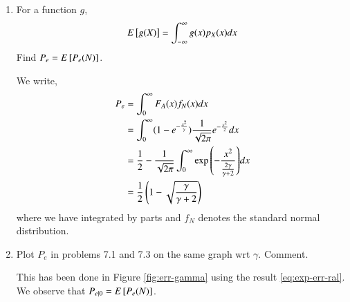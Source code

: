 \documentclass[journal,12pt,twocolumn]{IEEEtran}
\renewcommand\thesection{\arabic{section}}
\begin{document}
\begin{enumerate}[label=\thesection.\arabic*
,ref=\thesection.\theenumi]
\item For a function $g$,
	\begin{align}
		E{}\left[g(X)\right] = \int_{-\infty}^{\infty}g(x)p_X(x)dx
	\end{align}
Find $P_e = E{}\left[P_e(N)\right]$.

\solution
We write,
		\begin{align}
			P_e &= \int_{0}^{\infty}F_A(x)f_N(x)dx \\
			&= \int_{0}^{\infty}(1 - e^{-\frac{x^2}{\gamma}})\frac{1}{\sqrt{2\pi}}e^{-\frac{x^2}{2}}dx \\
			&= \frac{1}{2} - \frac{1}{\sqrt{2\pi}}\int_{0}^{\infty}\exp{\ensuremath{\left(-\frac{x^2}{\frac{2\gamma}{\gamma + 2}}\right)}}dx \\
			&= \frac{1}{2}\left(1 - \sqrt{\frac{\gamma}{\gamma + 2}}\right)
			\label{eq:exp-err-ral}
		\end{align}
where we have integrated by parts and $f_N$ denotes the standard normal distribution. 

\item Plot $P_e$ in problems 7.1 and 7.3 on the same graph wrt $\gamma$. Comment.

\solution
		This has been done in Figure \eqref{fig:err-gamma} using the result \eqref{eq:exp-err-ral}. We observe that $P_{e|0} = E{}\left[P_e(N)\right]$.
\end{enumerate}
\end{document}
